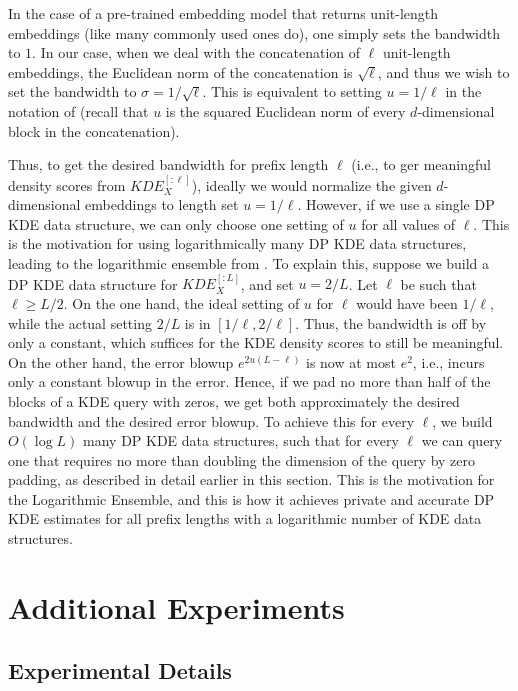 In the case of a pre-trained embedding model that returns unit-length embeddings (like many commonly used ones do), one simply sets the bandwidth to $1$. In our case, when we deal with the concatenation of $\ell$ unit-length embeddings, the Euclidean norm of the concatenation is $\sqrt{\ell}$, and thus we wish to set the bandwidth to $\sigma=1/\sqrt\ell$. This is equivalent to setting $u=1/\ell$ in the notation of  (recall that $u$ is the squared Euclidean norm of every $d$-dimensional block in the concatenation).

Thus, to get the desired bandwidth for prefix length $\ell$ (i.e., to ger meaningful density scores from $KDE^{[:\ell]}_X$), ideally we would normalize the given $d$-dimensional embeddings to length set $u=1/\ell$. 
%
However, if we use a single DP KDE data structure, we can only choose one setting of $u$ for all values of $\ell$. This is the motivation for using logarithmically many DP KDE data structures, leading to the logarithmic ensemble from . 
To explain this, suppose we build a DP KDE data structure for $KDE^{[:L]}_X$, and set $u=2/L$. Let $\ell$ be such that $\ell\geq L/2$. 
On the one hand, the ideal setting of $u$ for $\ell$ would have been $1/\ell$, while the actual setting $2/L$ is in $[1/\ell, 2/\ell]$. Thus, the bandwidth is off by only a constant, which suffices for the KDE density scores to still be meaningful. 
On the other hand, the error blowup $e^{2u(L-\ell)}$ is now at most $e^2$, i.e.,  incurs only a constant blowup in the error. Hence, if we pad no more than half of the blocks of a KDE query with zeros, we get both approximately the desired bandwidth and the desired error blowup. To achieve this for every $\ell$, we build $O(\log L)$ many DP KDE data structures, such that for every $\ell$ we can query one that requires no more than doubling the dimension of the query by zero padding, as described in detail earlier in this section. This is the motivation for the Logarithmic Ensemble, and this is how it achieves private and accurate DP KDE estimates for all prefix lengths with a logarithmic number of KDE data structures.

\section{Additional Experiments}\label{sec:experiments_appendix}

\subsection{Experimental Details}
